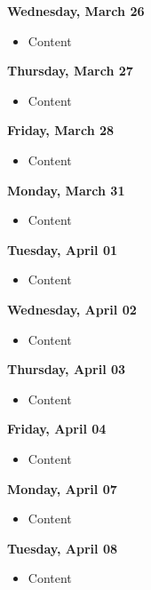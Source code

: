 \documentclass{article}
\begin{document}
\textbf{Wednesday, March 26}

\begin{itemize}
\item Content
\end{itemize}

\textbf{Thursday, March 27}

\begin{itemize}
\item Content
\end{itemize}

\textbf{Friday, March 28}

\begin{itemize}
\item Content
\end{itemize}

\textbf{Monday, March 31}

\begin{itemize}
\item Content
\end{itemize}

\textbf{Tuesday, April 01}

\begin{itemize}
\item Content
\end{itemize}

\textbf{Wednesday, April 02}

\begin{itemize}
\item Content
\end{itemize}

\textbf{Thursday, April 03}

\begin{itemize}
\item Content
\end{itemize}

\textbf{Friday, April 04}

\begin{itemize}
\item Content
\end{itemize}

\textbf{Monday, April 07}

\begin{itemize}
\item Content
\end{itemize}

\textbf{Tuesday, April 08}

\begin{itemize}
\item Content
\end{itemize}
\end{document}
